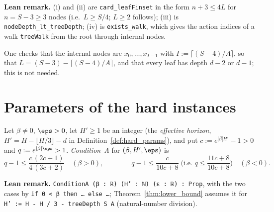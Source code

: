 \textbf{Lean remark.} (i) and (ii) are \texttt{card\_leafFinset} in the form $n + 3 \le 4L$ for $n = S - 3 \ge 3$
nodes (i.e.\ $L \ge S/4$; $L \ge 2$ follows); (iii) is \texttt{nodeDepth\_lt\_treeDepth}; (iv) is
\texttt{exists\_walk}, which gives the action indices of a walk \texttt{treeWalk} from the root through
internal nodes.

One checks that the internal nodes are $x_0, \dots, x_{I-1}$ with $I := \lceil (S-4)/A \rceil$, so that
$L = (S - 3) - \lceil (S-4)/A \rceil$, and that every leaf has depth $d - 2$ or $d - 1$; this is not needed.

\section{Parameters of the hard instances}
\label{sec:lb_params}

\begin{definition}[Condition~A]\label{def:condition_a}
\leanok
Let $\beta \ne 0$, $\eps > 0$, let $H' \ge 1$ be an integer (the \emph{effective horizon},
$H' = H - \lfloor H/3\rfloor - d$ in Definition~\ref{def:hard_params}), and put
$c := e^{|\beta| H'} - 1 > 0$ and $q := e^{|\beta|\eps} > 1$. \emph{Condition~A} for $(\beta, H', \eps)$
is
\[
  q - 1 \le \frac{c\,(2c+1)}{4\,(3c+2)} \quad (\beta > 0), \qquad\qquad
  q - 1 \le \frac{c}{10c + 8} \;\Big(\text{i.e.\ } q \le \frac{11c + 8}{10c + 8}\Big) \quad (\beta < 0).
\]
\end{definition}

\textbf{Lean remark.} \texttt{ConditionA (β : ℝ) (H' : ℕ) (ε : ℝ) : Prop}, with the two
cases by \texttt{if 0 < β then \dots\ else \dots}; Theorem~\ref{thm:lower_bound} assumes it for
\texttt{H' := H - H / 3 - treeDepth S A} (natural-number division).


